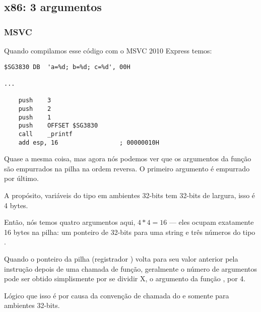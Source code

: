 \subsection{x86: 3 argumentos}

\subsubsection{MSVC}

Quando compilamos esse código com o MSVC 2010 Express temos:

\begin{lstlisting}
$SG3830	DB	'a=%d; b=%d; c=%d', 00H

...

	push	3
	push	2
	push	1
	push	OFFSET $SG3830
	call	_printf
	add	esp, 16					; 00000010H
\end{lstlisting}

Quase a mesma coisa, mas agora nós podemos ver que os argumentos da função \printf são empurrados na pilha na ordem reversa. O primeiro argumento é empurrado por último.

A propósito, variáveis do tipo \Tint em ambientes 32-bits tem 32-bits de largura, isso é 4 bytes.

Então, nós temos quatro argumentos aqui, $4*4=16$ --- eles ocupam exatamente 16 bytes na pilha: um ponteiro de 32-bits para uma string e três números do tipo \Tint.

Quando o ponteiro da pilha (registrador \ESP) volta para seu valor anterior pela instrução  depois de uma chamada de função,
geralmente o número de argumentos pode ser obtido simplismente por se dividir X, o argumento da função \ADD, por 4.

Lógico que isso é por causa da convenção de chamada do  e somente para ambientes 32-bits.


